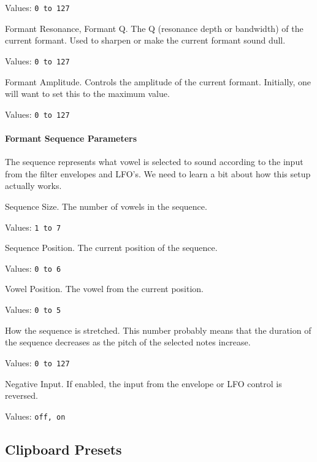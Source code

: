    Values:  \texttt{0 to 127}

   Formant Resonance, Formant Q.
   The Q (resonance depth or bandwidth) of the current formant.
   Used to sharpen or make the current formant sound dull.

   Values:  \texttt{0 to 127}

   Formant Amplitude.
   Controls the amplitude of the current formant.
   Initially, one will want to set this to the maximum value.

   Values:  \texttt{0 to 127}

\paragraph{Formant Sequence Parameters}
\label{paragraph:formant_sequence_parameters}

   The sequence represents what vowel is selected to sound according to the
   input from the filter envelopes and LFO's.
   We need to learn a bit about how this setup actually works.
 
   Sequence Size.
   The number of vowels in the sequence.

   Values:  \texttt{1 to 7}

   Sequence Position.
   The current position of the sequence.

   Values:  \texttt{0 to 6}

   Vowel Position.
   The vowel from the current position.

   Values:  \texttt{0 to 5}

   How the sequence is stretched.
   This number probably means that the duration of the sequence decreases as
   the pitch of the selected notes increase.

   Values:  \texttt{0 to 127}

   Negative Input.
   If enabled, the input from the envelope or LFO control is reversed.

   Values:  \texttt{off, on}

\subsection{Clipboard Presets}
\label{subsec:clipboard_presets}

